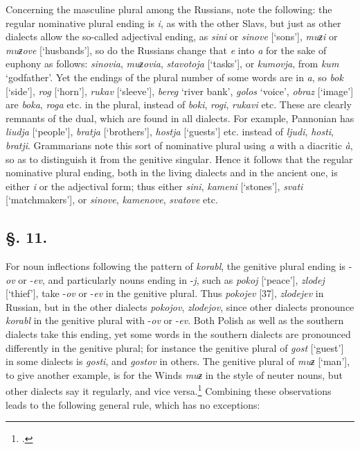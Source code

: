 Concerning the masculine plural among the Russians, note the following: the regular nominative plural ending is \textit{i}, as with the other Slavs, but just as other dialects allow the so-called adjectival ending, as \textit{sini} or \textit{sinove} [‘sons’], \textit{muƶi} or \textit{muƶove} [‘husbands’], so do the Russians change that \textit{e} into \textit{a} for the sake of euphony as follows: \textit{sinovia}, \textit{muƶovia}, \textit{stavotoja} [‘tasks’], or \textit{kumovja}, from \textit{kum} ‘godfather’. Yet the endings of the plural number of some words are in \textit{a}, so \textit{bok} [‘side’], \textit{rog} [‘horn’], \textit{rukav} [‘sleeve’], \textit{bereg} ‘river bank’, \textit{golos} ‘voice’, \textit{obraz} [‘image’] are \textit{boka}, \textit{roga} etc. in the plural, instead of \textit{boki}, \textit{rogi}, \textit{rukavi} etc. These are clearly remnants of the dual, which are found in all dialects. For example, Pannonian has \textit{liudja} [‘people’], \textit{bratja} [‘brothers’], \textit{hostja} [‘guests’] etc. instead of \textit{ljudi}, \textit{hosti}, \textit{bratji}. Grammarians note this sort of nominative plural using \textit{a} with a diacritic \textit{à}, so as to distinguish it from the genitive singular. Hence it follows that the regular nominative plural ending, both in the living dialects and in the ancient one, is either \textit{i} or the adjectival form; thus either \textit{sini}, \textit{kameni} [‘stones’], \textit{svati} [‘matchmakers’], or \textit{sinove}, \textit{kamenove}, \textit{svatove} etc.

\subsection*{\hspace*{\fill}§. 11.\hspace*{\fill}}

For noun inflections following the pattern of \textit{korabl}, the genitive plural ending is -\textit{ov} or -\textit{ev}, and particularly nouns ending in -\textit{j}, such as \textit{pokoj} [‘peace’], \textit{zlodej} [‘thief’], take -\textit{ov} or -\textit{ev} in the genitive plural. Thus \textit{pokojev} [37], \textit{zlodejev} in Russian, but in the other dialects \textit{pokojov}, \textit{zlodejov}, since other dialects pronounce \textit{korabl} in the genitive plural with -\textit{ov} or -\textit{ev}. Both Polish as well as the southern dialects take this ending, yet some words in the southern dialects are pronounced differently in the genitive plural; for instance the genitive plural of \textit{gost} [‘guest’] in some dialects is \textit{gosti}, and \textit{gostov} in others. The genitive plural of \textit{muƶ} [‘man’], to give another example, is for the Winds \textit{muƶ} in the style of neuter nouns, but other dialects say it regularly, and vice versa.\footnote{\citet[232]{kopitar_grammatik_1808}.} Combining these observations leads to the following general rule, which has no exceptions:

